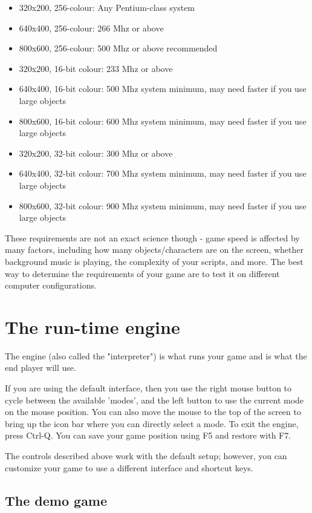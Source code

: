 \begin{itemize}\itemsep=0pt
\item 320x200, 256-colour:  Any Pentium-class system
\item 640x400, 256-colour:  266 Mhz or above
\item 800x600, 256-colour:  500 Mhz or above recommended
\item 320x200, 16-bit colour:  233 Mhz or above
\item 640x400, 16-bit colour:  500 Mhz system minimum, may need faster if you use large objects
\item 800x600, 16-bit colour:  600 Mhz system minimum, may need faster if you use large objects
\item 320x200, 32-bit colour:  300 Mhz or above
\item 640x400, 32-bit colour:  700 Mhz system minimum, may need faster if you use large objects
\item 800x600, 32-bit colour:  900 Mhz system minimum, may need faster if you use large objects
\end{itemize}

These requirements are not an exact science though - game speed is affected by many
factors, including how many objects/characters are on the screen, whether background music
is playing, the complexity of your scripts, and more. The best way to determine the requirements
of your game are to test it on different computer configurations.


\chapter{The run-time engine}%

The engine (also called the "interpreter") is what runs your game and is what
the end player will use.

If you are using the default interface, then you use the right mouse button to
cycle between the available 'modes', and the left button to use the current
mode on the mouse position. You can also move the mouse to the top of the
screen to bring up the icon bar where you can directly select a mode.
To exit the engine, press Ctrl-Q. You can save your game position using F5
and restore with F7.

The controls described above work with the default setup; however, you can
customize your game to use a different interface and shortcut keys.


\section{The demo game}%

